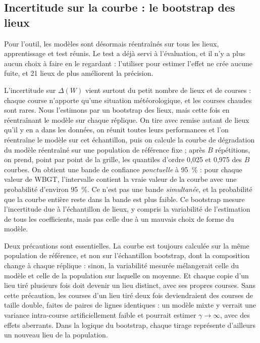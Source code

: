 \documentclass[11pt,a4paper]{article}
\begin{document}
\subsection{Incertitude sur la courbe : le bootstrap des lieux}\label{sec:bootstrap_courbe}

Pour l'outil, les modèles sont désormais réentraînés sur tous les lieux, apprentissage et test réunis. Le test a déjà
servi à l'évaluation, et il n'y a plus aucun choix à faire en le regardant : l'utiliser pour estimer l'effet ne crée
aucune fuite, et 21 lieux de plus améliorent la précision.

L'incertitude sur $\Delta(W)$ vient surtout du petit nombre de lieux et de courses : chaque course n'apporte qu'une
situation météorologique, et les courses chaudes sont rares. Nous l'estimons par un bootstrap des lieux, mais cette
fois en réentraînant le modèle sur chaque réplique. On tire avec remise autant de lieux qu'il y en a dans les données,
on réunit toutes leurs performances et l'on réentraîne le modèle sur cet échantillon, puis on calcule la courbe de
dégradation du modèle réentraîné sur une population de référence fixe ; après $B$ répétitions, on prend, point par
point de la grille, les quantiles d'ordre 0,025 et 0,975 des $B$ courbes. On obtient une bande de confiance
\emph{ponctuelle} à 95~\% : pour chaque valeur de WBGT, l'intervalle contient la vraie valeur de la courbe avec une
probabilité d'environ 95~\%. Ce n'est pas une bande \emph{simultanée}, et la probabilité que la courbe entière reste
dans la bande est plus faible. Ce bootstrap mesure l'incertitude due à l'échantillon de lieux, y compris la variabilité
de l'estimation de tous les coefficients, mais pas celle due à un mauvais choix de forme du modèle.

Deux précautions sont essentielles. La courbe est toujours calculée sur la même population de référence, et non sur
l'échantillon bootstrap, dont la composition change à chaque réplique : sinon, la variabilité mesurée mélangerait
celle du modèle et celle de la population sur laquelle on moyenne. Et chaque copie d'un lieu tiré plusieurs fois doit
devenir un lieu distinct, avec ses propres courses. Sans cette précaution, les courses d'un lieu tiré deux fois
deviendraient des courses de taille double, faites de paires de lignes identiques : un modèle mixte y verrait une
variance intra-course artificiellement faible et pourrait estimer $\gamma \to \infty$, avec des effets aberrants. Dans
la logique du bootstrap, chaque tirage représente d'ailleurs un nouveau lieu de la population.
\end{document}
